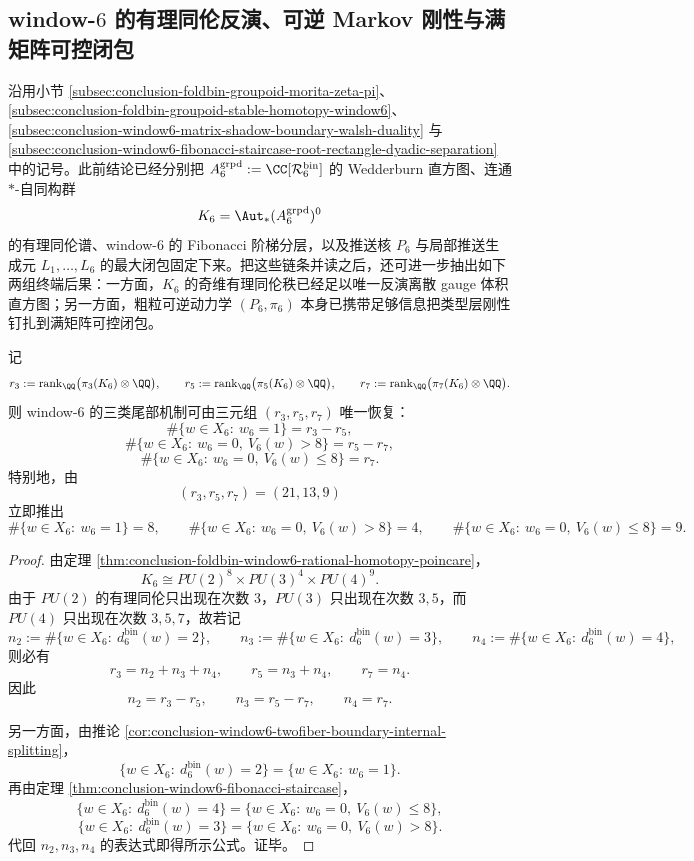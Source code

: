 \subsection{window-\texorpdfstring{$6$}{6} 的有理同伦反演、可逆 Markov 刚性与满矩阵可控闭包}\label{subsec:conclusion-window6-homotopy-markov-fullmatrix-rigidity}
沿用小节 \ref{subsec:conclusion-foldbin-groupoid-morita-zeta-pi}、
\ref{subsec:conclusion-foldbin-groupoid-stable-homotopy-window6}、
\ref{subsec:conclusion-window6-matrix-shadow-boundary-walsh-duality}
与
\ref{subsec:conclusion-window6-fibonacci-staircase-root-rectangle-dyadic-separation}
中的记号。此前结论已经分别把 \(A_6^{\mathrm{grpd}}:=\CC[\mathcal R_6^{\mathrm{bin}}]\) 的 Wedderburn 直方图、连通 \(\ast\)-自同构群
\[
K_6=\Aut_\ast(A_6^{\mathrm{grpd}})^0
\]
的有理同伦谱、window-\(6\) 的 Fibonacci 阶梯分层，以及推送核 \(P_6\) 与局部推送生成元 \(L_1,\dots,L_6\) 的最大闭包固定下来。把这些链条并读之后，还可进一步抽出如下两组终端后果：一方面，\(K_6\) 的奇维有理同伦秩已经足以唯一反演离散 gauge 体积直方图；另一方面，粗粒可逆动力学 \((P_6,\pi_6)\) 本身已携带足够信息把类型层刚性钉扎到满矩阵可控闭包。

\begin{theorem}\label{thm:conclusion-window6-rational-homotopy-inverts-tail-trichotomy}
记
\[
r_3:=\operatorname{rank}_{\QQ}\bigl(\pi_3(K_6)\otimes\QQ\bigr),
\qquad
r_5:=\operatorname{rank}_{\QQ}\bigl(\pi_5(K_6)\otimes\QQ\bigr),
\qquad
r_7:=\operatorname{rank}_{\QQ}\bigl(\pi_7(K_6)\otimes\QQ\bigr).
\]
则 window-\(6\) 的三类尾部机制可由三元组 \((r_3,r_5,r_7)\) 唯一恢复：
\[
\#\{w\in X_6:\ w_6=1\}=r_3-r_5,
\]
\[
\#\{w\in X_6:\ w_6=0,\ V_6(w)>8\}=r_5-r_7,
\]
\[
\#\{w\in X_6:\ w_6=0,\ V_6(w)\le 8\}=r_7.
\]
特别地，由
\[
(r_3,r_5,r_7)=(21,13,9)
\]
立即推出
\[
\#\{w\in X_6:\ w_6=1\}=8,
\qquad
\#\{w\in X_6:\ w_6=0,\ V_6(w)>8\}=4,
\qquad
\#\{w\in X_6:\ w_6=0,\ V_6(w)\le 8\}=9.
\]
\end{theorem}
\begin{proof}
由定理 \ref{thm:conclusion-foldbin-window6-rational-homotopy-poincare}，
\[
K_6\cong PU(2)^8\times PU(3)^4\times PU(4)^9.
\]
由于 \(PU(2)\) 的有理同伦只出现在次数 \(3\)，\(PU(3)\) 只出现在次数 \(3,5\)，而 \(PU(4)\) 只出现在次数 \(3,5,7\)，故若记
\[
n_2:=\#\{w\in X_6:\ d_6^{\mathrm{bin}}(w)=2\},
\qquad
n_3:=\#\{w\in X_6:\ d_6^{\mathrm{bin}}(w)=3\},
\qquad
n_4:=\#\{w\in X_6:\ d_6^{\mathrm{bin}}(w)=4\},
\]
则必有
\[
r_3=n_2+n_3+n_4,
\qquad
r_5=n_3+n_4,
\qquad
r_7=n_4.
\]
因此
\[
n_2=r_3-r_5,
\qquad
n_3=r_5-r_7,
\qquad
n_4=r_7.
\]

另一方面，由推论 \ref{cor:conclusion-window6-twofiber-boundary-internal-splitting}，
\[
\{w\in X_6:\ d_6^{\mathrm{bin}}(w)=2\}=\{w\in X_6:\ w_6=1\}.
\]
再由定理 \ref{thm:conclusion-window6-fibonacci-staircase}，
\[
\{w\in X_6:\ d_6^{\mathrm{bin}}(w)=4\}
=
\{w\in X_6:\ w_6=0,\ V_6(w)\le 8\},
\]
\[
\{w\in X_6:\ d_6^{\mathrm{bin}}(w)=3\}
=
\{w\in X_6:\ w_6=0,\ V_6(w)>8\}.
\]
代回 \(n_2,n_3,n_4\) 的表达式即得所示公式。证毕。
\end{proof}

